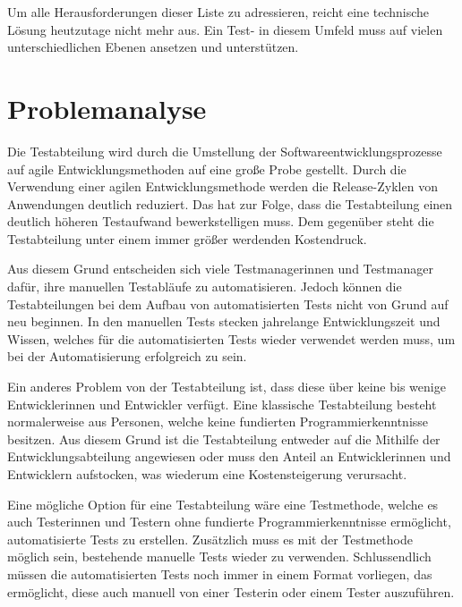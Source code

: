 \SuperPar
Um alle Herausforderungen dieser Liste zu adressieren, reicht eine technische Lösung heutzutage nicht mehr aus. Ein Test- in diesem Umfeld muss auf vielen unterschiedlichen Ebenen ansetzen und unterstützen. 


\section{Problemanalyse}
\label{cha:Problemanalyse}

Die Testabteilung wird durch die Umstellung der Softwareentwicklungsprozesse auf agile Entwicklungsmethoden auf eine große Probe gestellt. Durch die Verwendung einer agilen Entwicklungsmethode werden die Release-Zyklen von Anwendungen deutlich reduziert. Das hat zur Folge, dass die Testabteilung einen deutlich höheren Testaufwand bewerkstelligen muss. Dem gegenüber steht die Testabteilung unter einem immer größer werdenden Kostendruck. 

\SuperPar
Aus diesem Grund entscheiden sich viele Testmanagerinnen und Testmanager dafür, ihre manuellen Testabläufe zu automatisieren. Jedoch können die Testabteilungen bei dem Aufbau von automatisierten Tests nicht von Grund auf neu beginnen. In den manuellen Tests stecken jahrelange Entwicklungszeit und Wissen, welches für die automatisierten Tests wieder verwendet werden muss, um bei der Automatisierung erfolgreich zu sein. 

\SuperPar
Ein anderes Problem von der Testabteilung ist, dass diese über keine bis wenige Entwicklerinnen und Entwickler verfügt. Eine klassische Testabteilung besteht normalerweise aus Personen, welche keine fundierten Programmierkenntnisse besitzen. Aus diesem Grund ist die Testabteilung entweder auf die Mithilfe der Entwicklungsabteilung angewiesen oder muss den Anteil an Entwicklerinnen und Entwicklern aufstocken, was wiederum eine Kostensteigerung verursacht.

\SuperPar
Eine mögliche Option für eine Testabteilung wäre eine Testmethode, welche es auch Testerinnen und Testern ohne fundierte Programmierkenntnisse ermöglicht, automatisierte Tests zu erstellen. Zusätzlich muss es mit der Testmethode möglich sein, bestehende manuelle Tests wieder zu verwenden. Schlussendlich müssen die automatisierten Tests noch immer in einem Format vorliegen, das ermöglicht, diese auch manuell von einer Testerin oder einem Tester auszuführen.

